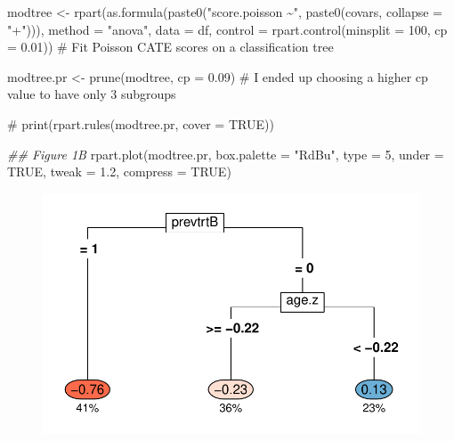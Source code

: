 \documentclass[
  letterpaper,
  DIV=11,
  numbers=noendperiod]{scrreprt}
\newenvironment{Shaded}{\begin{snugshade}}{\end{snugshade}}
\newcommand{\AttributeTok}[1]{\textcolor[rgb]{0.40,0.45,0.13}{#1}}
\newcommand{\CommentTok}[1]{\textcolor[rgb]{0.37,0.37,0.37}{#1}}
\newcommand{\ConstantTok}[1]{\textcolor[rgb]{0.56,0.35,0.01}{#1}}
\newcommand{\DecValTok}[1]{\textcolor[rgb]{0.68,0.00,0.00}{#1}}
\newcommand{\DocumentationTok}[1]{\textcolor[rgb]{0.37,0.37,0.37}{\textit{#1}}}
\newcommand{\FloatTok}[1]{\textcolor[rgb]{0.68,0.00,0.00}{#1}}
\newcommand{\FunctionTok}[1]{\textcolor[rgb]{0.28,0.35,0.67}{#1}}
\newcommand{\NormalTok}[1]{\textcolor[rgb]{0.00,0.23,0.31}{#1}}
\newcommand{\OtherTok}[1]{\textcolor[rgb]{0.00,0.23,0.31}{#1}}
\newcommand{\StringTok}[1]{\textcolor[rgb]{0.13,0.47,0.30}{#1}}
\begin{document}
\begin{Shaded}
\begin{Highlighting}[]
\NormalTok{modtree }\OtherTok{\textless{}{-}} \FunctionTok{rpart}\NormalTok{(}\FunctionTok{as.formula}\NormalTok{(}\FunctionTok{paste0}\NormalTok{(}\StringTok{"score.poisson \textasciitilde{}"}\NormalTok{, }\FunctionTok{paste0}\NormalTok{(covars, }\AttributeTok{collapse =} \StringTok{"+"}\NormalTok{))),}
                 \AttributeTok{method =} \StringTok{"anova"}\NormalTok{, }\AttributeTok{data =}\NormalTok{ df, }\AttributeTok{control =} \FunctionTok{rpart.control}\NormalTok{(}\AttributeTok{minsplit =} \DecValTok{100}\NormalTok{, }\AttributeTok{cp =} \FloatTok{0.01}\NormalTok{)) }\CommentTok{\# Fit Poisson CATE scores on a classification tree}

\NormalTok{modtree.pr }\OtherTok{\textless{}{-}} \FunctionTok{prune}\NormalTok{(modtree, }\AttributeTok{cp =} \FloatTok{0.09}\NormalTok{) }\CommentTok{\# I ended up choosing a higher cp value to have only 3 subgroups}

\CommentTok{\# print(rpart.rules(modtree.pr, cover = TRUE))}

\DocumentationTok{\#\# Figure 1B}
\FunctionTok{rpart.plot}\NormalTok{(modtree.pr, }\AttributeTok{box.palette =} \StringTok{"RdBu"}\NormalTok{, }\AttributeTok{type =} \DecValTok{5}\NormalTok{, }\AttributeTok{under =} \ConstantTok{TRUE}\NormalTok{, }\AttributeTok{tweak =} \FloatTok{1.2}\NormalTok{, }\AttributeTok{compress =} \ConstantTok{TRUE}\NormalTok{)}
\end{Highlighting}
\end{Shaded}

\begin{figure}[H]

{\centering \includegraphics{chapter_18_files/figure-pdf/itr.tree-2.pdf}

}

\end{figure}
\end{document}

